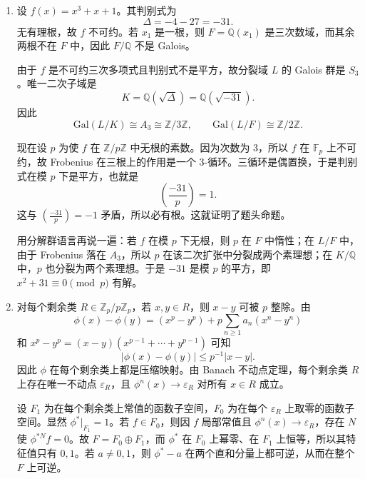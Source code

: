 \documentclass[UTF8,12pt]{ctexart}
\begin{document}
\begin{enumerate}[label=\textbf{\arabic*.},leftmargin=2.2em]
\begin{enumerate}[label=\textbf{(\alph*)},leftmargin=2.4em]
\item 若 \(k\ge n\)，选定一个固定的 \(n\times n\) 主子式 \(\Delta(x)\)；它满足 \(\Delta(gx)=\det(g)\Delta(x)\)。故 \(\Delta\in F_1\)。若 \(f\in F_1\)，则 \(f/\Delta\) 在 \(\Delta\neq0\) 的开集上是 \(O_n\)-不变量，所以属于 \(F_0\)。于是
\[
F_1=F_0\cdot \Delta,
\]
即 \(F_1\) 是 \(F_0\)-上的一维自由模。
\end{enumerate}

\item 设 \(f(x)=x^3+x+1\)。其判别式为
\[
\Delta=-4-27=-31.
\]
无有理根，故 \(f\) 不可约。若 \(x_1\) 是一根，则 \(F=\mathbb Q(x_1)\) 是三次数域，而其余两根不在 \(F\) 中，因此 \(F/\mathbb Q\) 不是 Galois。

由于 \(f\) 是不可约三次多项式且判别式不是平方，故分裂域 \(L\) 的 Galois 群是 \(S_3\)。唯一二次子域是
\[
K=\mathbb Q(\sqrt\Delta)=\mathbb Q(\sqrt{-31}).
\]
因此
\[
\mathrm{Gal}(L/K)\cong A_3\cong \mathbb Z/3\mathbb Z,
\qquad
\mathrm{Gal}(L/F)\cong \mathbb Z/2\mathbb Z.
\]

现在设 \(p\) 为使 \(f\) 在 \(\mathbb Z/p\mathbb Z\) 中无根的素数。因为次数为 3，所以 \(f\) 在 \(\mathbb F_p\) 上不可约，故 Frobenius 在三根上的作用是一个 3-循环。三循环是偶置换，于是判别式在模 \(p\) 下是平方，也就是
\[
\left(\frac{-31}{p}\right)=1.
\]
这与 \(\left(\frac{-31}{p}\right)=-1\) 矛盾，所以必有根。这就证明了题头命题。

用分解群语言再说一遍：若 \(f\) 在模 \(p\) 下无根，则 \(p\) 在 \(F\) 中惰性；在 \(L/F\) 中，由于 Frobenius 落在 \(A_3\)，所以 \(p\) 在该二次扩张中分裂成两个素理想；在 \(K/\mathbb Q\) 中，\(p\) 也分裂为两个素理想。于是 \(-31\) 是模 \(p\) 的平方，即 \(x^2+31\equiv0\pmod p\) 有解。

\item 对每个剩余类 \(R\in\mathbb Z_p/p\mathbb Z_p\)，若 \(x,y\in R\)，则 \(x-y\) 可被 \(p\) 整除。由
\[
\phi(x)-\phi(y)=(x^p-y^p)+p\sum_{n\ge1}a_n(x^n-y^n)
\]
和 \(x^p-y^p=(x-y)(x^{p-1}+\cdots+y^{p-1})\) 可知
\[
|\phi(x)-\phi(y)|\le p^{-1}|x-y|.
\]
因此 \(\phi\) 在每个剩余类上都是压缩映射。由 Banach 不动点定理，每个剩余类 \(R\) 上存在唯一不动点 \(\varepsilon_R\)，且 \(\phi^n(x)\to\varepsilon_R\) 对所有 \(x\in R\) 成立。

设 \(F_1\) 为在每个剩余类上常值的函数子空间，\(F_0\) 为在每个 \(\varepsilon_R\) 上取零的函数子空间。显然 \(\phi^*|_{F_1}=1\)。若 \(f\in F_0\)，则因 \(f\) 局部常值且 \(\phi^n(x)\to\varepsilon_R\)，存在 \(N\) 使 \(\phi^{*N}f=0\)。故 \(F=F_0\oplus F_1\)，而 \(\phi^*\) 在 \(F_0\) 上幂零、在 \(F_1\) 上恒等，所以其特征值只有 \(0,1\)。若 \(a\neq0,1\)，则 \(\phi^*-a\) 在两个直和分量上都可逆，从而在整个 \(F\) 上可逆。


\end{enumerate}
\end{document}
